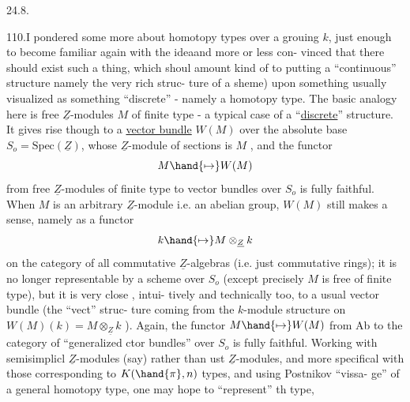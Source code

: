 

24.8.

110.\quad I pondered some more about homotopy types over a grouing $k$,
just enough to become familiar again with the idea\hand{,}and more or less con-%
vinced that there should exist such a thing, which  shoul amount\hand{,}
kind of\hand{,} to putting a ``continuous'' structure namely the very rich struc-%
ture of a sheme) upon something usually visualized as something ``discrete''
- namely a homotopy type. The basic analogy here is free $\underline{Z}$-modules $M$
of finite type - a typical case of a ``\uline{discrete}'' structure. It gives
rise though to a \uline{vector bundle} $W(M)$ over the absolute base $S_o=\mathrm{Spec}(\underline{Z})$,
whose $\underline{Z}$-module of sections is $M$ , and the functor
\[ M \hand{\mapsto} W(M) \]
from free $\underline{Z}$-modules of finite type to vector bundles over $S_o$ is fully
faithful. When $M$ is an arbitrary $\underline{Z}$-module i.e. an abelian group, $W(M)$
still makes a sense, namely as a functor
\[ k \hand{\mapsto} M\otimes_{\underline{Z}}k \]
on the category of all commutative $\underline{Z}$-algebras (i.e. just commutative
rings); it is no longer representable by a scheme over $S_o$ (except 
precisely  $M$ is free of finite type), but it is very close , intui-%
tively and technically too, to a usual vector bundle (the ``vect'' struc-%
ture coming from the $k$-module structure on $W(M)(k) = M\otimes_{\underline{Z}}k$ ). Again,
the functor $M\hand{\mapsto} W(M)$ from Ab to the category of ``generalized ctor
bundles'' over $S_o$ is fully faithful. Working with semisimplicl
$\underline{Z}$-modules (say) rather than ust $\underline{Z}$-modules, and more specifical
with those corresponding to $K(\hand{\pi},n)$ types, and using Postnikov ``vissa-%
ge'' of a general homotopy type, one may hope to ``represent'' th type,
